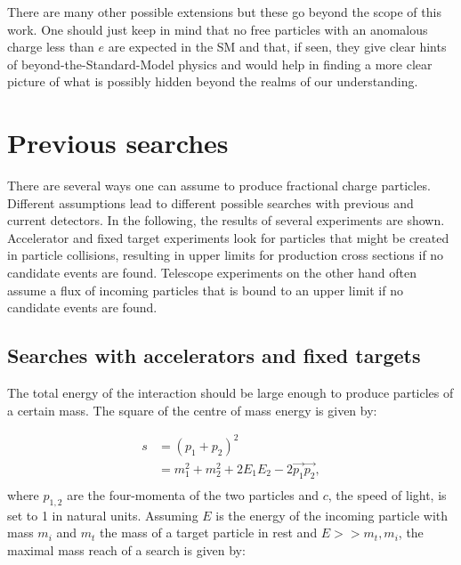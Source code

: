 There are many other possible extensions but these go beyond the scope of this work. One should just keep in mind that no free particles with an anomalous charge less than $e$ are expected in the SM and that, if seen, they give clear hints of beyond-the-Standard-Model physics and would help in finding a more clear picture of what is possibly hidden beyond the realms of our understanding.





\section{Previous searches}
\label{sec:prevsearches}
There are several ways one can assume to produce fractional charge particles. Different assumptions lead to different possible searches with previous and current detectors. In the following, the results of several experiments are shown. Accelerator and fixed target experiments look for particles that might be created in particle collisions, resulting in upper limits for production cross sections if no candidate events are found. Telescope experiments on the other hand often assume a flux of incoming particles that is bound to an upper limit if no candidate events are found.

\subsection{Searches with accelerators and fixed targets}
The total energy of the interaction should be large enough to produce particles of a certain mass. The square of the centre of mass energy is given by:

\begin{equation}
\label{eq:totalenergy}
\begin{split}
s &= \left(p_1 + p_2\right)^2\\
&= m_1^2 + m_2^2 + 2E_1E_2 - 2\vec{p_1}\vec{p_2},\\
\end{split}
\end{equation}
where $p_{1,2}$ are the four-momenta of the two particles and $c$, the speed of light, is set to 1 in natural units.
Assuming $E$ is the energy of the incoming particle with mass $m_i$ and $m_t$ the mass of a target particle in rest and $E >> m_t, m_i$, the maximal mass reach of a search is given by:

